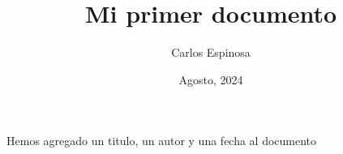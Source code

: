 \documentclass[12pt, letterpaper, twoside]{article}
\title{Mi primer documento}
\author{Carlos Espinosa}
\date{Agosto, 2024}
\begin{document}
 
\maketitle
 
Hemos agregado un titulo, un autor y una fecha al documento
\end{document}
